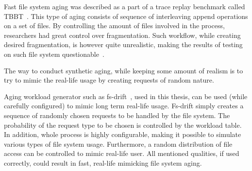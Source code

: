 \documentclass[
  color, %
  table, %
  lof,   %
  lot,   %
]{fithesis3}
\begin{document}
Fast file system aging was described as a part of a trace replay benchmark called TBBT~\cite{Zhu:2005:TSA:1251028.1251052}. This type of aging consists of sequence of interleaving append operations on a set of files. By controlling the amount of files involved in the process, researchers had great control over fragmentation. Such workflow, while creating desired fragmentation, is however quite unrealistic, making the results of testing on such file system questionable~\cite{Traeger:2008:NYS:1367829.1367831}.

The way to conduct synthetic aging, while keeping some amount of realism is to try to mimic the real-life usage by creating requests of random nature. 

Aging workload generator such as fs-drift~\cite{fs-drift:github}, used in this thesis, can be used (while carefully configured) to mimic long term real-life usage. Fs-drift simply creates a sequence of randomly chosen requests to be handled by the file system. The probability of the request type to be chosen is controlled by the workload table. In addition, whole process is highly configurable, making it possible to simulate various types of file system usage. Furthermore, a random distribution of file access can be controlled to mimic real-life user. All mentioned qualities, if used correctly, could result in fast, real-life mimicking file system aging.













\end{document}
